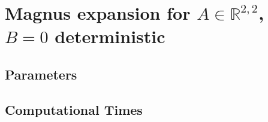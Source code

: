 \section{Magnus expansion for $A\in \mathbb{R}^{2,2}$, $B=0$ deterministic}
	
\subsection{Parameters}
	
\subsection{Computational Times}
	
